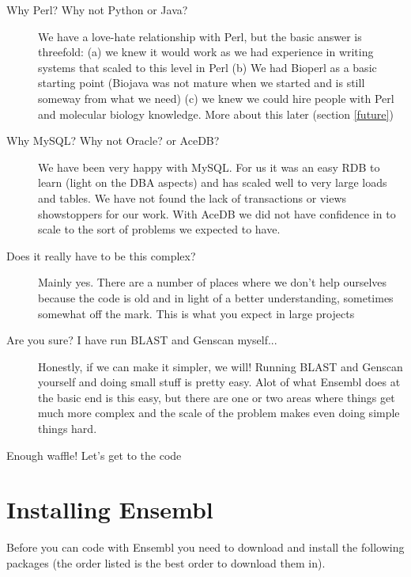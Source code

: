 \documentclass[11pt,a4paper]{article}
\begin{document}
\begin{description}
\item[Why Perl? Why not Python or Java?] We have a love-hate relationship
with Perl, but the basic answer is threefold: (a) we knew it would work
as we had experience in writing systems that scaled to this level in Perl
(b) We had Bioperl as a basic starting point (Biojava was not mature when we
started and is still someway from what we need) (c) we knew we could hire people
with Perl and molecular biology knowledge. More about this later (section \ref{future})
\item[Why MySQL? Why not Oracle? or AceDB?] We have been very happy with MySQL.
For us it was an easy RDB to learn (light on the DBA aspects) and has scaled well
to very large loads and tables. We have not found the lack of transactions or views
showstoppers for our work. With AceDB we did not have confidence in to scale to the
sort of problems we expected to have.
\item[Does it really have to be this complex?] Mainly yes. There are a number of places
where we don't help ourselves because the code is old and in light of a better
understanding, sometimes somewhat off the mark. This is what you expect in large
projects
\item[Are you sure? I have run BLAST and Genscan myself...] Honestly, if we can make it
simpler, we will! Running BLAST and Genscan yourself and doing small
stuff is pretty easy. Alot of what Ensembl does at the basic end is
this easy, but there are one or two areas where things get much more complex and
the scale of the problem makes even doing simple things hard.
\end{description}

Enough waffle! Let's get to the code

\section{Installing Ensembl}

Before you can code with Ensembl you need to download and install the
following packages (the order listed is the best order to download them in).
\end{document}
